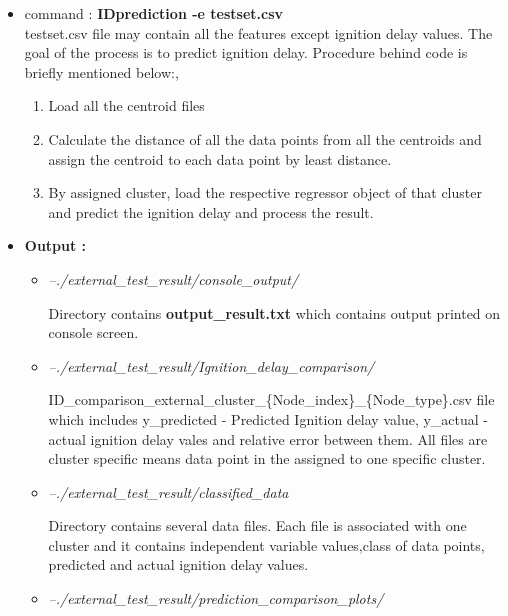 \documentclass[12pt]{article}
\begin{document}
\begin{itemize}[wide = 0pt, labelwidth = 1.3333em, labelsep = 0.3333em, leftmargin = \dimexpr{} + \relax ]
\begin{itemize}
				\item command : \textbf{IDprediction -e testset.csv} \\
				
				\subitem testset.csv file may contain all the features except ignition delay values. The goal of the process is to predict ignition delay.
				Procedure behind code is briefly mentioned below:,
				\begin{enumerate}
					\item Load all the centroid files 
					\item Calculate the distance of all the data points from all the centroids and assign the centroid to each data point by least distance.
					\item By assigned cluster, load the respective regressor object of that cluster and predict the ignition delay and process the result.
				
				\end{enumerate}								
			\item \textbf{Output :}

				\begin{itemize}
					\item \textit{--./external\_test\_result/console\_output/}
					
					Directory contains \textbf{output\_result.txt } which contains output printed on console screen.\\
					
					\item \textit{--./external\_test\_result/Ignition\_delay\_comparison/}
					
					 {ID\_comparison\_external\_cluster\_\{Node\_index\}\_\{Node\_type\}.csv} file which includes y\_predicted - Predicted Ignition delay value, y\_actual - actual ignition delay vales and relative error between them.
					All files are cluster specific means data point in the assigned to one specific cluster.\\
					
					\item \textit{--./external\_test\_result/classified\_data}
					
					Directory contains several data files. Each file is associated with one cluster and it contains independent variable values,class of data points, predicted and actual ignition delay values.\\
					
					\item \textit{--./external\_test\_result/prediction\_comparison\_plots/}
					

\end{itemize}
\end{itemize}
\end{itemize}
\end{document}
